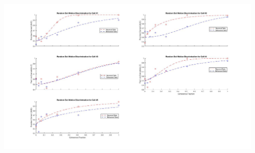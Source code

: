 \documentclass{121Temp}
\begin{document}
\hwproblem
\includegraphics[scale=.30]{metric_curves}
\end{document}
